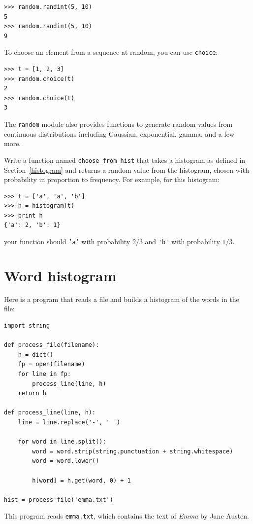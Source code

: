 \documentclass[10pt]{book}
\begin{document}

\beforeverb
\begin{verbatim}
>>> random.randint(5, 10)
5
>>> random.randint(5, 10)
9
\end{verbatim}
\afterverb
%
To choose an element from a sequence at random, you can use
{\tt choice}:


\beforeverb
\begin{verbatim}
>>> t = [1, 2, 3]
>>> random.choice(t)
2
>>> random.choice(t)
3
\end{verbatim}
\afterverb
%
The {\tt random} module also provides functions to generate
random values from continuous distributions including
Gaussian, exponential, gamma, and a few more.

\begin{ex}


Write a function named \verb"choose_from_hist" that takes
a histogram as defined in Section~\ref{histogram} and returns a 
random value from the histogram, chosen with probability
in proportion to frequency.  For example, for this histogram:

\beforeverb
\begin{verbatim}
>>> t = ['a', 'a', 'b']
>>> h = histogram(t)
>>> print h
{'a': 2, 'b': 1}
\end{verbatim}
\afterverb
%
your function should {\tt 'a'} with probability $2/3$ and \verb"'b'"
with probability $1/3$.
\end{ex}


\section{Word histogram}

Here is a program that reads a file and builds a histogram of the
words in the file:


\beforeverb
\begin{verbatim}
import string

def process_file(filename):
    h = dict()
    fp = open(filename)
    for line in fp:
        process_line(line, h)
    return h

def process_line(line, h):
    line = line.replace('-', ' ')
    
    for word in line.split():
        word = word.strip(string.punctuation + string.whitespace)
        word = word.lower()

        h[word] = h.get(word, 0) + 1

hist = process_file('emma.txt')
\end{verbatim}
\afterverb
%
This program reads {\tt emma.txt}, which contains the text of {\em
  Emma} by Jane Austen.
\end{document}
